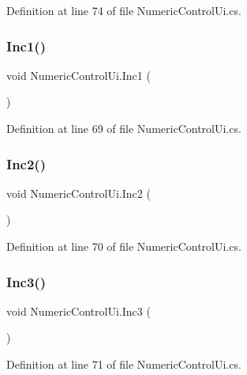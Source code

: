 Definition at line 74 of file Numeric\+Control\+Ui.\+cs.

\mbox{\label{class_numeric_control_ui_acbca58e1608cef5a26dd50f27804b55a}} 
\subsubsection{\texorpdfstring{Inc1()}{Inc1()}}
{\footnotesize\ttfamily void Numeric\+Control\+Ui.\+Inc1 (\begin{DoxyParamCaption}{ }\end{DoxyParamCaption})}



Definition at line 69 of file Numeric\+Control\+Ui.\+cs.

\mbox{\label{class_numeric_control_ui_a2c6f6262aa2610841deae715120b5ac4}} 
\subsubsection{\texorpdfstring{Inc2()}{Inc2()}}
{\footnotesize\ttfamily void Numeric\+Control\+Ui.\+Inc2 (\begin{DoxyParamCaption}{ }\end{DoxyParamCaption})}



Definition at line 70 of file Numeric\+Control\+Ui.\+cs.

\mbox{\label{class_numeric_control_ui_a24bb521b7ba4f796cd17d8897f654f5c}} 
\subsubsection{\texorpdfstring{Inc3()}{Inc3()}}
{\footnotesize\ttfamily void Numeric\+Control\+Ui.\+Inc3 (\begin{DoxyParamCaption}{ }\end{DoxyParamCaption})}



Definition at line 71 of file Numeric\+Control\+Ui.\+cs.

